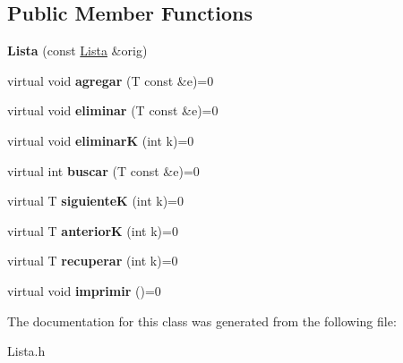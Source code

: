 \subsection*{Public Member Functions}
\begin{DoxyCompactItemize}
\item 
\hypertarget{class_lista_ad63a49df32595e2f321fffd7ffa1346a}{}\label{class_lista_ad63a49df32595e2f321fffd7ffa1346a} 
{\bfseries Lista} (const \hyperlink{class_lista}{Lista} \&orig)
\item 
\hypertarget{class_lista_a1093c2435a3be6d4a74dd75f14ef1428}{}\label{class_lista_a1093c2435a3be6d4a74dd75f14ef1428} 
virtual void {\bfseries agregar} (T const \&e)=0
\item 
\hypertarget{class_lista_a9d459c3698152b71b928e0d9b2d0a318}{}\label{class_lista_a9d459c3698152b71b928e0d9b2d0a318} 
virtual void {\bfseries eliminar} (T const \&e)=0
\item 
\hypertarget{class_lista_aea4b7bb82c177d45fd05b4e98449b45d}{}\label{class_lista_aea4b7bb82c177d45fd05b4e98449b45d} 
virtual void {\bfseries eliminarK} (int k)=0
\item 
\hypertarget{class_lista_ac29cb21fd75a23a34ff7ff517b350b5b}{}\label{class_lista_ac29cb21fd75a23a34ff7ff517b350b5b} 
virtual int {\bfseries buscar} (T const \&e)=0
\item 
\hypertarget{class_lista_a42b835552326bc087ac9b13bdba12262}{}\label{class_lista_a42b835552326bc087ac9b13bdba12262} 
virtual T {\bfseries siguienteK} (int k)=0
\item 
\hypertarget{class_lista_a05bd7ecb7fee94d7203d017899710c3a}{}\label{class_lista_a05bd7ecb7fee94d7203d017899710c3a} 
virtual T {\bfseries anteriorK} (int k)=0
\item 
\hypertarget{class_lista_ace159f98c2e63a7d2f042c9f2bd1e0ed}{}\label{class_lista_ace159f98c2e63a7d2f042c9f2bd1e0ed} 
virtual T {\bfseries recuperar} (int k)=0
\item 
\hypertarget{class_lista_af398229330911af031fc1d89a556a840}{}\label{class_lista_af398229330911af031fc1d89a556a840} 
virtual void {\bfseries imprimir} ()=0
\end{DoxyCompactItemize}


The documentation for this class was generated from the following file\+:\begin{DoxyCompactItemize}
\item 
Lista.\+h\end{DoxyCompactItemize}
